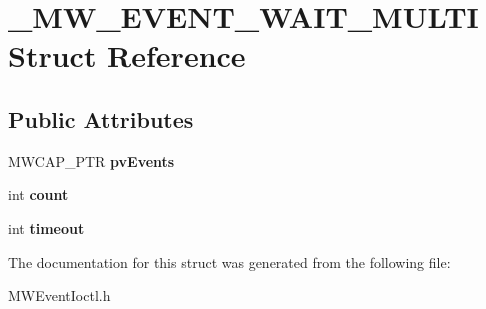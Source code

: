 \hypertarget{struct__MW__EVENT__WAIT__MULTI}{\section{\-\_\-\-M\-W\-\_\-\-E\-V\-E\-N\-T\-\_\-\-W\-A\-I\-T\-\_\-\-M\-U\-L\-T\-I Struct Reference}
\label{struct__MW__EVENT__WAIT__MULTI}
}
\subsection*{Public Attributes}
\begin{DoxyCompactItemize}
\item 
\hypertarget{struct__MW__EVENT__WAIT__MULTI_aae67c00cbe639e8894ecc245eb4c9c65}{M\-W\-C\-A\-P\-\_\-\-P\-T\-R {\bfseries pv\-Events}}\label{struct__MW__EVENT__WAIT__MULTI_aae67c00cbe639e8894ecc245eb4c9c65}

\item 
\hypertarget{struct__MW__EVENT__WAIT__MULTI_a26f74a12ce3027cea940ab83e979f197}{int {\bfseries count}}\label{struct__MW__EVENT__WAIT__MULTI_a26f74a12ce3027cea940ab83e979f197}

\item 
\hypertarget{struct__MW__EVENT__WAIT__MULTI_a6d3c5199c0d2ba8a104ec29684540ffe}{int {\bfseries timeout}}\label{struct__MW__EVENT__WAIT__MULTI_a6d3c5199c0d2ba8a104ec29684540ffe}

\end{DoxyCompactItemize}


The documentation for this struct was generated from the following file\-:\begin{DoxyCompactItemize}
\item 
M\-W\-Event\-Ioctl.\-h\end{DoxyCompactItemize}
